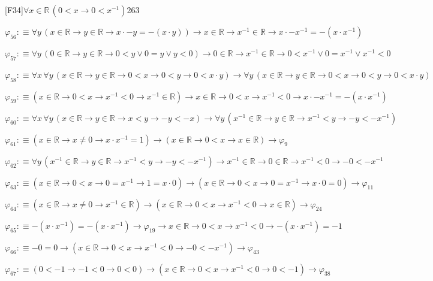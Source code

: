 \begin{fullproof}{[F34]}{$\forall x \in \mathbb{R}\,(0 < x \to 0 < x^{-1})$}{263}
\begin{abbrevlist}
\item $\varphi_{56} :\equiv \forall y\,(x \in \mathbb{R} \to y \in \mathbb{R} \to x \cdot -y = -(x \cdot y)) \to x \in \mathbb{R} \to x^{-1} \in \mathbb{R} \to x \cdot -x^{-1} = -(x \cdot x^{-1})$
\item $\varphi_{57} :\equiv \forall y\,(0 \in \mathbb{R} \to y \in \mathbb{R} \to 0 < y \lor 0 = y \lor y < 0) \to 0 \in \mathbb{R} \to x^{-1} \in \mathbb{R} \to 0 < x^{-1} \lor 0 = x^{-1} \lor x^{-1} < 0$
\item $\varphi_{58} :\equiv \forall x\,\forall y\,(x \in \mathbb{R} \to y \in \mathbb{R} \to 0 < x \to 0 < y \to 0 < x \cdot y) \to \forall y\,(x \in \mathbb{R} \to y \in \mathbb{R} \to 0 < x \to 0 < y \to 0 < x \cdot y)$
\item $\varphi_{59} :\equiv (x \in \mathbb{R} \to 0 < x \to x^{-1} < 0 \to x^{-1} \in \mathbb{R}) \to x \in \mathbb{R} \to 0 < x \to x^{-1} < 0 \to x \cdot -x^{-1} = -(x \cdot x^{-1})$
\item $\varphi_{60} :\equiv \forall x\,\forall y\,(x \in \mathbb{R} \to y \in \mathbb{R} \to x < y \to -y < -x) \to \forall y\,(x^{-1} \in \mathbb{R} \to y \in \mathbb{R} \to x^{-1} < y \to -y < -x^{-1})$
\item $\varphi_{61} :\equiv (x \in \mathbb{R} \to x \neq 0 \to x \cdot x^{-1} = 1) \to (x \in \mathbb{R} \to 0 < x \to x \in \mathbb{R}) \to \varphi_{9}$
\item $\varphi_{62} :\equiv \forall y\,(x^{-1} \in \mathbb{R} \to y \in \mathbb{R} \to x^{-1} < y \to -y < -x^{-1}) \to x^{-1} \in \mathbb{R} \to 0 \in \mathbb{R} \to x^{-1} < 0 \to -0 < -x^{-1}$
\item $\varphi_{63} :\equiv (x \in \mathbb{R} \to 0 < x \to 0 = x^{-1} \to 1 = x \cdot 0) \to (x \in \mathbb{R} \to 0 < x \to 0 = x^{-1} \to x \cdot 0 = 0) \to \varphi_{11}$
\item $\varphi_{64} :\equiv (x \in \mathbb{R} \to x \neq 0 \to x^{-1} \in \mathbb{R}) \to (x \in \mathbb{R} \to 0 < x \to x^{-1} < 0 \to x \in \mathbb{R}) \to \varphi_{24}$
\item $\varphi_{65} :\equiv -(x \cdot x^{-1}) = -(x \cdot x^{-1}) \to \varphi_{19} \to x \in \mathbb{R} \to 0 < x \to x^{-1} < 0 \to -(x \cdot x^{-1}) = -1$
\item $\varphi_{66} :\equiv -0 = 0 \to (x \in \mathbb{R} \to 0 < x \to x^{-1} < 0 \to -0 < -x^{-1}) \to \varphi_{43}$
\item $\varphi_{67} :\equiv (0 < -1 \to -1 < 0 \to 0 < 0) \to (x \in \mathbb{R} \to 0 < x \to x^{-1} < 0 \to 0 < -1) \to \varphi_{38}$

\end{abbrevlist}
\end{fullproof}
